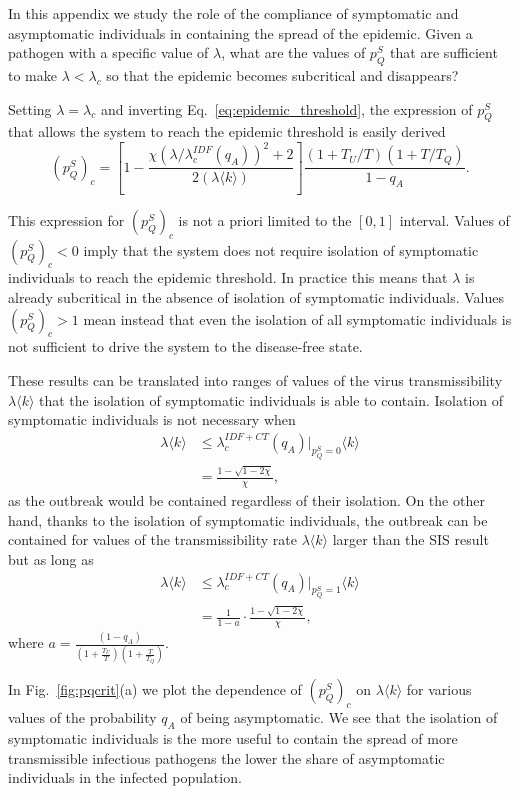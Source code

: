 \documentclass[aps,twocolumn,superscriptaddress,nofootinbib,pre,floatfix]{revtex4-1}
\begin{document}
In this appendix we study the role of the compliance of symptomatic
and asymptomatic individuals in containing the spread of the epidemic.
Given a pathogen with a specific value of $\lambda$, what are the values
of $p_Q^S$ that are sufficient to make $\lambda<\lambda_c$ so that the epidemic
becomes subcritical and disappears?

Setting $\lambda=\lambda_c$ and inverting Eq.~\eqref{eq:epidemic_threshold}, the expression of $p_Q^S$ that allows the system to reach the epidemic threshold is easily derived 
\begin{equation}
    (p_Q^S)_{c} = \left[1 - \frac{\chi (\lambda / \lambda_c^{IDF}(q_A))^2 + 2}{2 (\lambda \langle k \rangle)}\right]\frac{(1 + T_U/T)(1+T/T_Q)}{1-q_A}.
\end{equation}

This expression for $(p_Q^S)_c$ is not a priori limited
to the $[0, 1]$ interval. Values of $(p_Q^S)_c < 0$ imply that the
system does not require isolation of symptomatic individuals to reach
the epidemic threshold. In practice this means that $\lambda$ is already subcritical in the absence of isolation of symptomatic individuals.
Values $(p_Q^S)_c > 1$ mean instead that even the
isolation of all symptomatic individuals is not sufficient to drive the
system to the disease-free state.

These results can be translated into ranges of values of the
virus transmissibility $\lambda \langle k \rangle$ that the
isolation of symptomatic individuals is able to contain.  Isolation of
symptomatic individuals is not necessary when
\begin{align}
  \lambda \langle k \rangle &\leq \lambda_c^{IDF+CT}(q_A)|_{p_Q^S=0} \langle k \rangle\\
    &= \frac{1- \sqrt{1- 2 \chi}}{\chi},
\end{align}
as the outbreak would be contained regardless of their isolation.  On
the other hand, thanks to the isolation of symptomatic individuals,
the outbreak can be contained for values of the transmissibility rate
$\lambda \langle k \rangle$ larger than the SIS result but as long as
\begin{align}
    \lambda \langle k \rangle &\leq \lambda_c^{IDF+CT}(q_A)|_{p_Q^S=1} \langle k \rangle\\
    &= \frac{1}{1-a} \cdot \frac{1- \sqrt{1- 2 \chi}}{\chi},
\end{align}
where $a = \frac{(1-q_A)}{(1+\frac{T_U}{T})(1 + \frac{T}{T_Q})}$.


In Fig.~\ref{fig:pqcrit}(a) we plot the dependence of $(p_Q^S)_c$ on
$\lambda \langle k \rangle$ for various values of the probability
$q_A$ of being asymptomatic. We see that the isolation of symptomatic
individuals is the more useful to contain the spread of more
transmissible infectious pathogens the lower the share of
asymptomatic individuals in the infected population.
\end{document}
